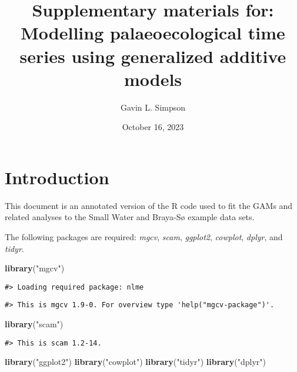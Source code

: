 \documentclass[12pt,]{article}
\title{Supplementary materials for: Modelling palaeoecological time series
using generalized additive models}
\author{Gavin L. Simpson}
\date{October 16, 2023}
\newenvironment{Shaded}{\begin{snugshade}}{\end{snugshade}}
\newcommand{\KeywordTok}[1]{\textcolor[rgb]{0.13,0.29,0.53}{\textbf{#1}}}
\newcommand{\NormalTok}[1]{#1}
\newcommand{\StringTok}[1]{\textcolor[rgb]{0.31,0.60,0.02}{#1}}
\begin{document}
\maketitle

\hypertarget{introduction}{%
\section{Introduction}\label{introduction}}

This document is an annotated version of the R code used to fit the GAMs
and related analyses to the Small Water and Braya-Sø example data sets.

The following packages are required: \emph{mgcv}, \emph{scam},
\emph{ggplot2}, \emph{cowplot}, \emph{dplyr}, and \emph{tidyr}.

\begin{Shaded}
\begin{Highlighting}[]
\KeywordTok{library}\NormalTok{(}\StringTok{"mgcv"}\NormalTok{)}
\end{Highlighting}
\end{Shaded}

\begin{verbatim}
#> Loading required package: nlme
\end{verbatim}

\begin{verbatim}
#> This is mgcv 1.9-0. For overview type 'help("mgcv-package")'.
\end{verbatim}

\begin{Shaded}
\begin{Highlighting}[]
\KeywordTok{library}\NormalTok{(}\StringTok{"scam"}\NormalTok{)}
\end{Highlighting}
\end{Shaded}

\begin{verbatim}
#> This is scam 1.2-14.
\end{verbatim}

\begin{Shaded}
\begin{Highlighting}[]
\KeywordTok{library}\NormalTok{(}\StringTok{"ggplot2"}\NormalTok{)}
\KeywordTok{library}\NormalTok{(}\StringTok{"cowplot"}\NormalTok{)}
\KeywordTok{library}\NormalTok{(}\StringTok{"tidyr"}\NormalTok{)}
\KeywordTok{library}\NormalTok{(}\StringTok{"dplyr"}\NormalTok{)}
\end{Highlighting}
\end{Shaded}
\end{document}
